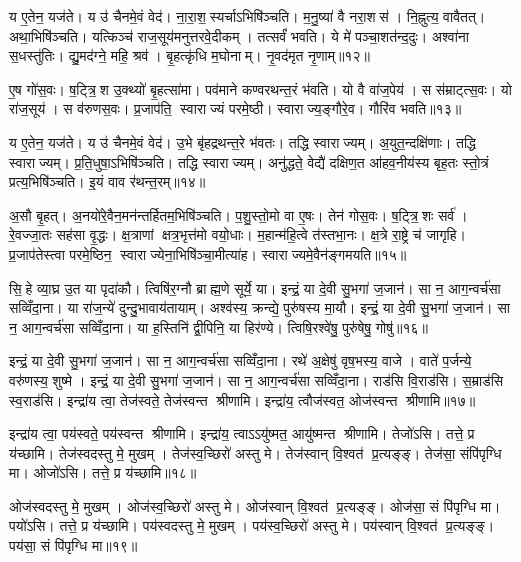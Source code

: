 य ए॒तेन॒ यज॑ते। य उ॑ चैनमे॒वं वेद॑। ना॒रा॒श॒स्यर्चाऽभिषि॑ञ्चति। म॒नु॒ष्या॑ वै नरा॒शस॑। नि॒ह्नुत्य॒ वावैतत्। अथा॒भिषि॑ञ्चति। यत्किञ्च॑ राज॒सूय॑मनुत्तरवे॒दीकम्। तत्सर्वं॑ भवति। ये मे॑ पञ्चा॒शत॑न्द॒दुः। अश्वा॑ना स॒धस्तु॑तिः। द्यु॒मद॑ग्ने॒ महि॒ श्रव॑। बृ॒हत्कृ॑धि म॒घोनाम्। नृ॒वद॑मृत नृ॒णाम्॥१२॥\anuvakamend[सू॒य॒ते॒ स॒धस्तु॑ति॒स्त्रीणि॑ च]

ए॒ष गो॑स॒वः। ष॒ट्त्रि॒श उ॒क्थ्यो॑ बृ॒हत्सा॑मा। पव॑माने कण्वरथन्त॒रं भ॑वति। यो वै वा॑ज॒पेय॑। स स॑म्राट्त्स॒वः। यो रा॑ज॒सूय॑। स व॑रुणस॒वः। प्र॒जाप॑ति॒ स्वाराज्यं परमे॒ष्ठी। स्वाराज्य॒ङ्गौरे॒व। गौरि॑व भवति॥१३॥

य ए॒तेन॒ यज॑ते। य उ॑ चैनमे॒वं वेद॑। उ॒भे बृ॑हद्रथन्त॒रे भ॑वतः। तद्धि स्वाराज्यम्। अ॒युत॒न्दक्षि॑णाः। तद्धि स्वाराज्यम्। प्र॒ति॒धुषा॒ऽभिषि॑ञ्चति। तद्धि स्वाराज्यम्। अनु॑द्धते॒ वेद्यै॑ दक्षिण॒त आ॑हव॒नीय॑स्य बृह॒तः स्तो॒त्रं प्रत्य॒भिषि॑ञ्चति। इ॒यं वाव र॑थन्त॒रम्॥१४॥

अ॒सौ बृ॒हत्। अ॒नयो॑रे॒वैन॒मन॑न्तर्\mbox{}हितम॒भिषि॑ञ्चति। प॒शु॒स्तो॒मो वा ए॒षः। तेन॑ गोस॒वः। ष॒ट्त्रि॒शः सर्व॑। रे॒वज्जा॒तः सह॑सा वृ॒द्धः। क्ष॒त्राणां क्षत्र॒भृत्त॑मो वयो॒धाः। म॒हान्म॑हि॒त्वे त॑स्तभा॒नः। क्ष॒त्रे रा॒ष्ट्रे च॑ जागृहि। प्र॒जाप॑तेस्त्वा परमे॒ष्ठिन॒ स्वाराज्येना॒भिषि॑ञ्चा॒मीत्या॑ह। स्वाराज्यमे॒वैन॑ङ्गमयति॥१५॥\anuvakamend[इ॒व॒ भ॒व॒ति॒ र॒थ॒न्त॒रमा॒हैकं च]

सि॒हे व्या॒घ्र उ॒त या पृदा॑कौ। त्विषि॑र॒ग्नौ ब्राह्म॒णे सूर्ये॒ या। इन्द्रं॒ या दे॒वी सु॒भगा॑ ज॒जान॑। सा न॒ आग॒न्वर्च॑सा सव्विँदा॒ना। या रा॑ज॒न्ये॑ दुन्दु॒भावाय॑तायाम्। अश्व॑स्य॒ क्रन्द्ये॒ पुरु॑षस्य मा॒यौ। इन्द्रं॒ या दे॒वी सु॒भगा॑ ज॒जान॑। सा न॒ आग॒न्वर्च॑सा सव्विँदा॒ना। या ह॒स्तिनि॑ द्वी॒पिनि॒ या हिर॑ण्ये। त्विषि॒रश्वे॑षु॒ पुरु॑षेषु॒ गोषु॑॥१६॥

इन्द्रं॒ या दे॒वी सु॒भगा॑ ज॒जान॑। सा न॒ आग॒न्वर्च॑सा सव्विँदा॒ना। रथे॑ अ॒क्षेषु॑ वृष॒भस्य॒ वाजे। वाते॑ प॒र्जन्ये॒ वरु॑णस्य॒ शुष्मे। इन्द्रं॒ या दे॒वी सु॒भगा॑ ज॒जान॑। सा न॒ आग॒न्वर्च॑सा सव्विँदा॒ना। राड॑सि वि॒राड॑सि। स॒म्राड॑सि स्व॒राड॑सि। इन्द्रा॑य त्वा॒ तेज॑स्वते॒ तेज॑स्वन्त श्रीणामि। इन्द्रा॑य॒ त्वौज॑स्वत॒ ओज॑स्वन्त श्रीणामि॥१७॥

इन्द्रा॑य त्वा॒ पय॑स्वते॒ पय॑स्वन्त श्रीणामि। इन्द्रा॑य॒ त्वाऽऽयु॑ष्मत॒ आयु॑ष्मन्त श्रीणामि। तेजो॑ऽसि। तत्ते॒ प्र य॑च्छामि। तेज॑स्वदस्तु मे॒ मुखम्। तेज॑स्व॒च्छिरो॑ अस्तु मे। तेज॑स्वान् वि॒श्वत॑ प्र॒त्यङ्ङ्। तेज॑सा॒ संपि॑पृग्धि मा। ओजो॑ऽसि। तत्ते॒ प्र य॑च्छामि॥१८॥

ओज॑स्वदस्तु मे॒ मुखम्। ओज॑स्व॒च्छिरो॑ अस्तु मे। ओज॑स्वान् वि॒श्वत॑ प्र॒त्यङ्ङ्। ओज॑सा॒ सं पि॑पृग्धि मा। पयो॑ऽसि। तत्ते॒ प्र य॑च्छामि। पय॑स्वदस्तु मे॒ मुखम्। पय॑स्व॒च्छिरो॑ अस्तु मे। पय॑स्वान् वि॒श्वत॑ प्र॒त्यङ्ङ्। पय॑सा॒ सं पि॑पृग्धि मा॥१९॥

